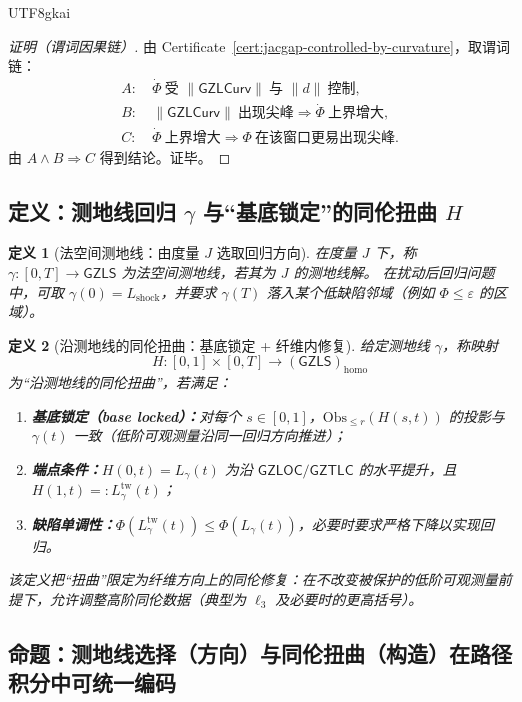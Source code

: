 \documentclass[12pt]{article}
\newtheorem{definition}{定义}[section]
\newcommand{\GZLS}{\ensuremath{\mathsf{GZLS}}}
\newcommand{\GZLOC}{\ensuremath{\mathsf{GZLOC}}}
\newcommand{\GZLCurv}{\ensuremath{\mathsf{GZLCurv}}}
\newcommand{\GZTLC}{\ensuremath{\mathsf{GZTLC}}}
\begin{document}
\begin{CJK*}{UTF8}{gkai}
\begin{proof}[证明（谓词因果链）]
由 Certificate~\ref{cert:jacgap-controlled-by-curvature}，取谓词链：
\[
\begin{aligned}
A:&\ \dot\Phi\ \text{受 }\|\GZLCurv\|\ \text{与 }\|d\|\ \text{控制},\\
B:&\ \|\GZLCurv\|\ \text{出现尖峰}\Rightarrow \dot\Phi\ \text{上界增大},\\
C:&\ \dot\Phi\ \text{上界增大}\Rightarrow \Phi\ \text{在该窗口更易出现尖峰}.
\end{aligned}
\]
由 $A\wedge B\Rightarrow C$ 得到结论。证毕。
\end{proof}

\subsection{定义：测地线回归 $\gamma$ 与“基底锁定”的同伦扭曲 $H$}

\begin{definition}[法空间测地线：由度量 $J$ 选取回归方向]
\label{def:lawspace-geodesic}
在度量 $J$ 下，称 $\gamma:[0,T]\to\GZLS$ 为法空间测地线，若其为 $J$ 的测地线解。
在扰动后回归问题中，可取 $\gamma(0)=L_{\mathrm{shock}}$，并要求 $\gamma(T)$ 落入某个低缺陷邻域（例如 $\Phi\le \varepsilon$ 的区域）。
\end{definition}

\begin{definition}[沿测地线的同伦扭曲：基底锁定 + 纤维内修复]
\label{def:geodesic-homotopy-twist}
给定测地线 $\gamma$，称映射
\[
H:[0,1]\times[0,T]\to (\GZLS)_{\mathrm{homo}}
\]
为“沿测地线的同伦扭曲”，若满足：
\begin{enumerate}
  \item \textbf{基底锁定（base locked）：}对每个 $s\in[0,1]$，$\mathrm{Obs}_{\le r}(H(s,t))$ 的投影与 $\gamma(t)$ 一致（低阶可观测量沿同一回归方向推进）；
  \item \textbf{端点条件：}$H(0,t)=L_\gamma(t)$ 为沿 $\GZLOC/\GZTLC$ 的水平提升，且 $H(1,t)=:L_\gamma^{\mathrm{tw}}(t)$；
  \item \textbf{缺陷单调性：}$\Phi(L_\gamma^{\mathrm{tw}}(t))\le \Phi(L_\gamma(t))$，必要时要求严格下降以实现回归。
\end{enumerate}
该定义把“扭曲”限定为纤维方向上的同伦修复：在不改变被保护的低阶可观测量前提下，允许调整高阶同伦数据（典型为 $\ell_3$ 及必要时的更高括号）。
\end{definition}

\subsection{命题：测地线选择（方向）与同伦扭曲（构造）在路径积分中可统一编码}


\end{CJK*}
\end{document}
